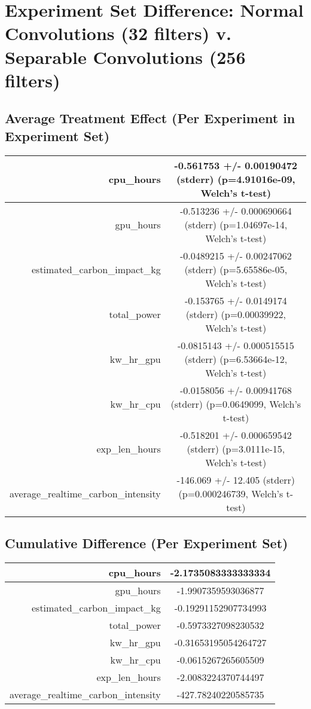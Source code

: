 \documentclass{article}%
\begin{document}
%
\normalsize%
\section{Experiment Set Difference: Normal Convolutions (32 filters) v. Separable Convolutions (256 filters)}%
\label{sec:Experiment Set Difference Normal Convolutions (32 filters) v. Separable Convolutions (256 filters)}%
\subsection{Average Treatment Effect (Per Experiment in Experiment Set)}%
\label{subsec:Average Treatment Effect (Per Experiment in Experiment Set)}%
\begin{tabular}{|r|c|}%
\hline%
cpu\_hours&{-}0.561753 +/{-} 0.00190472 (stderr) (p=4.91016e{-}09, Welch's t{-}test)\\%
\hline%
gpu\_hours&{-}0.513236 +/{-} 0.000690664 (stderr) (p=1.04697e{-}14, Welch's t{-}test)\\%
\hline%
estimated\_carbon\_impact\_kg&{-}0.0489215 +/{-} 0.00247062 (stderr) (p=5.65586e{-}05, Welch's t{-}test)\\%
\hline%
total\_power&{-}0.153765 +/{-} 0.0149174 (stderr) (p=0.00039922, Welch's t{-}test)\\%
\hline%
kw\_hr\_gpu&{-}0.0815143 +/{-} 0.000515515 (stderr) (p=6.53664e{-}12, Welch's t{-}test)\\%
\hline%
kw\_hr\_cpu&{-}0.0158056 +/{-} 0.00941768 (stderr) (p=0.0649099, Welch's t{-}test)\\%
\hline%
exp\_len\_hours&{-}0.518201 +/{-} 0.000659542 (stderr) (p=3.0111e{-}15, Welch's t{-}test)\\%
\hline%
average\_realtime\_carbon\_intensity&{-}146.069 +/{-} 12.405 (stderr) (p=0.000246739, Welch's t{-}test)\\%
\hline%
\end{tabular}

%
\subsection{Cumulative Difference (Per Experiment Set)}%
\label{subsec:Cumulative Difference (Per Experiment Set)}%
\begin{tabular}{|r|c|}%
\hline%
cpu\_hours&{-}2.1735083333333334\\%
\hline%
gpu\_hours&{-}1.9907359593036877\\%
\hline%
estimated\_carbon\_impact\_kg&{-}0.19291152907734993\\%
\hline%
total\_power&{-}0.5973327098230532\\%
\hline%
kw\_hr\_gpu&{-}0.31653195054264727\\%
\hline%
kw\_hr\_cpu&{-}0.0615267265605509\\%
\hline%
exp\_len\_hours&{-}2.0083224370744497\\%
\hline%
average\_realtime\_carbon\_intensity&{-}427.78240220585735\\%
\hline%
\end{tabular}

%
\end{document}
